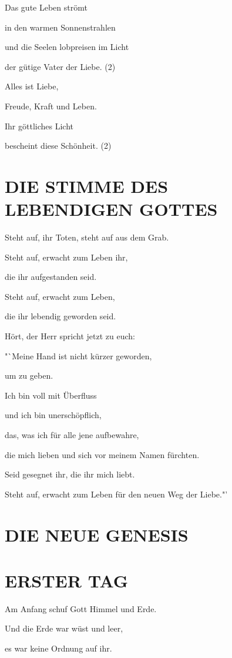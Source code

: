 \documentclass[11pt,a5paper,twoside]{article}
\begin{document}
Das gute Leben strömt

in den warmen Sonnenstrahlen

und die Seelen lobpreisen im Licht

der gütige Vater der Liebe. (2)

Alles ist Liebe,

Freude, Kraft und Leben.

Ihr göttliches Licht

bescheint diese Schönheit. (2) 


\section[Die Stimme des lebendigen Gottes]{DIE STIMME DES LEBENDIGEN GOTTES}

Steht auf, ihr Toten, steht auf aus dem Grab.

Steht auf, erwacht zum Leben ihr, 

die ihr aufgestanden seid.

Steht auf, erwacht zum Leben,

die ihr lebendig geworden seid.

Hört, der Herr spricht jetzt zu euch:

"`Meine Hand ist nicht kürzer geworden,

um zu geben.

Ich bin voll mit Überfluss

und ich bin unerschöpflich,

das, was ich für alle jene aufbewahre,

die mich lieben und sich vor meinem Namen fürchten.

Seid gesegnet ihr, die ihr mich liebt.

Steht auf, erwacht zum Leben für den neuen Weg der Liebe."'

\section[Die neue Genesis]{DIE NEUE GENESIS}

\section[Erster Tag]{ERSTER TAG}

Am Anfang schuf Gott Himmel und Erde.

Und die Erde war wüst und leer, 

es war keine Ordnung auf ihr. 
\end{document}
